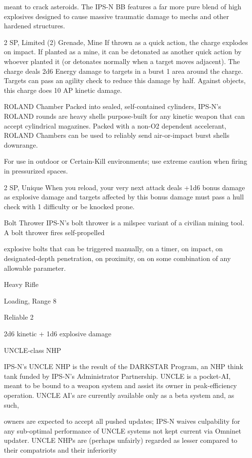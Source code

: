 meant to crack asteroids. The IPS-N BB features a far more pure blend of high explosives designed to
cause massive traumatic damage to mechs and other hardened structures.

2 SP, Limited (2)
Grenade, Mine
If thrown as a quick action, the charge explodes on impact. If planted as a mine, it can be
detonated as another quick action by whoever planted it (or detonates normally when a target
moves adjacent). The charge deals 2d6 Energy damage to targets in a burst 1 area around the
charge. Targets can pass an agility check to reduce this damage by half. Against objects, this
charge does 10 AP kinetic damage.

ROLAND Chamber
Packed into sealed, self-contained cylinders, IPS-N’s ROLAND rounds are heavy shells purpose-built for
any kinetic weapon that can accept cylindrical magazines. Packed with a non-O2 dependent accelerant,
ROLAND Chambers can be used to reliably send air-or-impact burst shells downrange.

For use in outdoor or Certain-Kill environments; use extreme caution when firing in pressurized spaces.

2 SP, Unique
When you reload, your very next attack deals +1d6 bonus damage as explosive damage and
targets affected by this bonus damage must pass a hull check with 1 difficulty or be knocked
prone.


Bolt Thrower
IPS-N’s bolt thrower is a milspec variant of a civilian mining tool. A bolt thrower fires self-propelled

explosive bolts that can be triggered manually, on a timer, on impact, on designated-depth penetration, on
proximity, on on some combination of any allowable parameter.

Heavy Rifle

Loading, Range 8

Reliable 2

2d6 kinetic + 1d6 explosive damage


UNCLE-class NHP




IPS-N’s UNCLE NHP is the result of the DARKSTAR Program, an NHP think tank funded by IPS-N’s
Administrator Partnership. UNCLE is a pocket-AI, meant to be bound to a weapon system and assist its
owner in peak-efficiency operation. UNCLE AI’s are currently available only as a beta system and, as such,

owners are expected to accept all pushed updates; IPS-N waives culpability for any sub-optimal
performance of UNCLE systems not kept current via Omninet updater.
UNCLE NHPs are (perhaps unfairly) regarded as lesser compared to their compatriots and their inferiority

